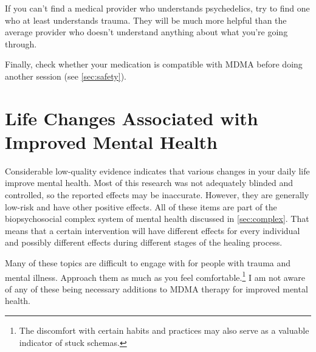 \documentclass[11pt,oneside]{book}
\begin{document}
If you can't find a medical provider who understands psychedelics, try to find one who at least understands trauma. They will be much more helpful than the average provider who doesn't understand anything about what you're going through.

Finally, check whether your medication is compatible with MDMA before doing another session (see \cref{sec:safety}).

\section{Life Changes Associated with Improved Mental Health}
\label{sec:lifechanges}
Considerable low-quality evidence indicates that various changes in your daily life improve mental health. Most of this research was not adequately blinded and controlled, so the reported effects may be inaccurate. However, they are generally low-risk and have other positive effects. All of these items are part of the biopsychosocial complex system of mental health discussed in \cref{sec:complex}. That means that a certain intervention will have different effects for every individual and possibly different effects during different stages of the healing process.

Many of these topics are difficult to engage with for people with trauma and mental illness. Approach them as much as you feel comfortable.\footnote{The discomfort with certain habits and practices may also serve as a valuable indicator of stuck schemas.} I am not aware of any of these being necessary additions to MDMA therapy for improved mental health.
\end{document}
